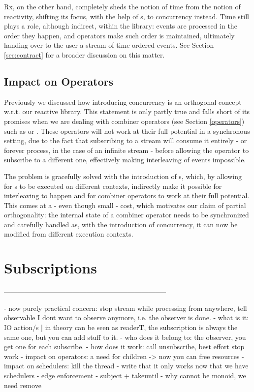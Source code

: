 Rx, on the other hand, completely sheds the notion of time from the notion of reactivity\cite{meijer2010observable}, shifting its focus, with the help of s, to concurrency instead. Time still plays a role, although indirect, within the library: events are processed in the order they happen, and operators make such order is maintained, ultimately handing over to the user a stream of time-ordered events. See Section \ref{sec:contract} for a broader discussion on this matter.

\subsection{Impact on Operators}

Previously we discussed how introducing concurrency is an orthogonal concept w.r.t. our reactive library. This statement is only partly true and falls short of its promises when we are dealing with combiner operators (see Section \ref{operators}) such as \code{(>>=)} or . These operators will not work at their full potential in a synchronous setting, due to the fact that subscribing to a stream will consume it entirely - or forever process, in the case of an infinite stream - before allowing the operator to subscribe to a different one, effectively making interleaving of events impossible.

The problem is gracefully solved with the introduction of s, which, by allowing for s to be executed on different contexts, indirectly make it possible for interleaving to happen and for combiner operators to work at their full potential. This comes at a - even though small - cost, which motivates our claim of partial orthogonality: the internal state of a combiner operator needs to be synchronized and carefully handled as, with the introduction of concurrency, it can now be modified from different execution contexts.


\section{Subscriptions}
\label{sec:subscriptions}

-----------------------------------------------------------------------

- now purely practical concern: stop stream while processing from anywhere, tell observable I dont want to observe anymore, i.e. the observer is done.
- what is it: IO action/s | in theory can be seen as readerT, the subscription is always the same one, but you can add stuff to it. 
- who does it belong to: the observer, you get one for each subscribe.
- how does it work: call unsubscribe, best effort stop work
- impact on operators: a need for children -> now you can free resources 
- impact on schedulers: kill the thread
- write that it only works now that we have schedulers
- edge enforcement
- subject + takeuntil
- why cannot be monoid, we need remove

